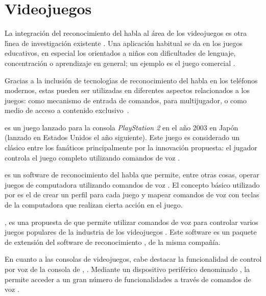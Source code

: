 \section{Videojuegos}
\label{sec:videojuegos}

La integraci\'on del reconocimiento del habla al \'area de los videojuegos es otra l{\'\i}nea de
investigaci\'on existente \cite{SporkaNonSpeech2006, JanickiAutomatic2011}. 
Una aplicaci\'on habitual se da en los juegos educativos, en especial los orientados a ni\~nos 
con dificultades de lenguaje, concentraci\'on o aprendizaje en general; un ejemplo es el juego
comercial  \cite{SayNPlay}.

Gracias a la inclusi\'on de tecnolog{\'\i}as de reconocimiento del habla en los tel\'efonos modernos,
estas pueden ser utilizadas en diferentes aspectos relacionados a los juegos: como mecanismo de entrada 
de comandos, para  multijugador, o como medio de acceso a contenido 
\mbox{exclusivo \cite{JoselliMobile2009}}.

 es un juego lanzado para la consola \emph{PlayStation 2} en el a\~no 2003 en Jap\'on (lanzado en Estados Unidos
el a\~no siguiente). Este
juego es considerado un cl\'asico entre los fan\'aticos principalmente por la innovaci\'on propuesta: el jugador controla 
el juego completo utilizando comandos de voz \cite{Lifeline}.

 es un software de reconocimiento del habla que permite, entre otras cosas, operar juegos de computadora
utilizando comandos de voz \cite{tazti}. El concepto b\'asico utilizado por  es el de crear un perfil para
cada juego y mapear comandos de voz con teclas de la computadora que realizan cierta acci\'on en el juego.

, es una propuesta de  que permite utilizar
comandos de voz para controlar varios juegos populares de la industria de los videojuegos 
\cite{DragonGamingSpeech}. Este software es un paquete de extensi\'on del software de reconocimiento 
, de la misma compa\~n\'ia.

En cuanto a las consolas de videojuegos, cabe destacar la funcionalidad de control por voz de la consola
de , . Mediante un dispositivo perif\'erico denominado 
, la  permite acceder a un gran n\'umero de funcionalidades 
a trav\'es de comandos de voz \cite{KinectVoice}.